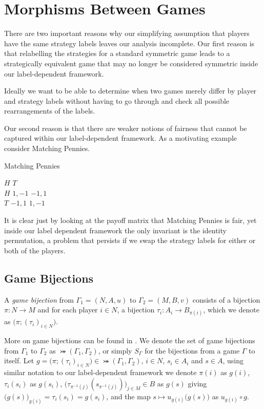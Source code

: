 \section{Morphisms Between Games} \label{sec:morphisms}
There are two important reasons why our simplifying assumption that players have the same strategy labels leaves our analysis incomplete. Our first reason is that relabelling the strategies for a standard symmetric game leads to a strategically equivalent game that may no longer be considered symmetric inside our label-dependent framework. 

Ideally we want to be able to determine when two games merely differ by player and strategy labels without having to go through and check all possible rearrangements of the labels.

Our second reason is that there are weaker notions of fairness that cannot be captured within our label-dependent framework. As a motivating example consider Matching Pennies.

\begin{example} \label{MPeg}
	Matching Pennies
	\begin{center}
		\begin{game}{2}{2}
			      \> $H$    \> $T$ \\
			$H$   \> $1,-1$  \> $-1,1$ \\
			$T$   \> $-1,1$  \> $1,-1$
		\end{game} 
	\end{center}
	It is clear just by looking at the payoff matrix that Matching Pennies is fair, yet inside our label dependent framework the only invariant is the identity permutation, a problem that persists if we swap the strategy labels for either or both of the players.             
\end{example}

\subsection{Game Bijections}    
	\begin{definition}
		A \textit{game bijection} from $\Gamma_1 = (N, A, u)$ to $\Gamma_2 = (M, B, v)$ consists of a bijection $\pi:N\rightarrow M$ and for each player $i \in N$, a bijection $\tau_i:A_i\rightarrow B_{\pi(i)}$, which we denote as $\bigl(\pi; (\tau_i)_{i \in N}\bigr)$.
	\end{definition}

	More on game bijections can be found in \cite{IsoComplexity}. We denote the set of game bijections from $\Gamma_1$ to $\Gamma_2$ as $\bij(\Gamma_1, \Gamma_2)$, or simply $S_{\Gamma}$ for the bijections from a game $\Gamma$ to itself. Let $g = \bigl(\pi; (\tau_i)_{i \in N}\bigr) \in \bij(\Gamma_1, \Gamma_2)$, $i \in N$, $s_i \in A_i$ and $s \in A$, using similar notation to our label-dependent framework we denote $\pi(i)$ as $g(i)$, $\tau_i(s_i)$ as $g(s_i)$, $\bigl(\tau_{\pi^{-1}(j)}(s_{\pi^{-1}(j)})\bigr)_{j \in M} \in B$ as $g(s)$ giving $\bigl(g(s)\bigr)_{g(i)} = \tau_i(s_i) = g(s_i)$, and the map $s \mapsto u_{g(i)}\bigl(g(s)\bigr)$ as $u_{g(i)} \circ g$. 	
	
